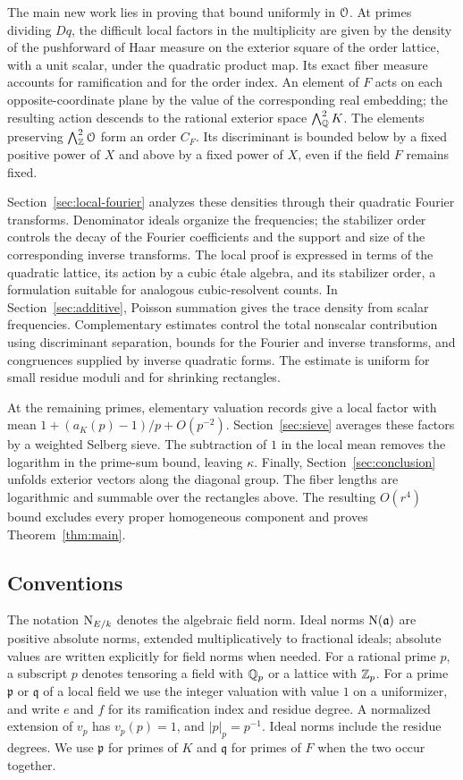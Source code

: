 The main new work lies in proving that bound uniformly in $\mathcal O$.  At primes
dividing $Dq$, the difficult local factors in the multiplicity are given by
the density of the pushforward of Haar measure on the exterior square of the
order lattice, with a unit scalar, under the quadratic product map.
Its exact fiber measure accounts for ramification and for the order index.
An element of $F$ acts on each opposite-coordinate plane by the value of the
corresponding real embedding; the resulting action descends to the rational
exterior space $\bigwedge^2_{\mathbb Q}K$.  The elements preserving
$\bigwedge^2_{\mathbb Z}\mathcal O$ form an order $C_F$.  Its discriminant is bounded
below by a fixed positive power of $X$ and above by a fixed power of $X$,
even if the field $F$ remains fixed.

Section~\ref{sec:local-fourier} analyzes these densities through their
quadratic Fourier transforms.  Denominator ideals organize the frequencies;
the stabilizer order controls the decay of the Fourier coefficients and the
support and size of the corresponding inverse transforms.  The local proof
is expressed in terms of the quadratic lattice, its action by a cubic
\'etale algebra, and its stabilizer order, a formulation suitable for
analogous cubic-resolvent counts.  In Section~\ref{sec:additive}, Poisson
summation gives the trace density from scalar frequencies.  Complementary
estimates control the total nonscalar contribution using discriminant
separation, bounds for the Fourier and inverse transforms, and congruences
supplied by inverse quadratic forms.  The estimate is uniform for small
residue moduli and for shrinking rectangles.

At the remaining primes, elementary valuation records give a local factor
with mean $1+(a_K(p)-1)/p+O(p^{-2})$.  Section~\ref{sec:sieve} averages
these factors by a weighted Selberg sieve.  The subtraction of $1$ in the
local mean removes the logarithm in the prime-sum bound, leaving $\kappa$.
Finally, Section~\ref{sec:conclusion} unfolds exterior vectors along the
diagonal group.  The fiber lengths are logarithmic and summable over the
rectangles above.  The resulting $O(r^4)$ bound excludes every proper
homogeneous component and proves Theorem~\ref{thm:main}.

\subsection{Conventions}

The notation $\operatorname{N}_{E/k}$ denotes the algebraic field norm.  Ideal norms
$\operatorname{N}(\mathfrak a)$ are positive absolute norms, extended multiplicatively
to fractional ideals; absolute values are written explicitly for field
norms when needed.  For a rational prime $p$,
a subscript $p$ denotes tensoring a field with $\mathbb Q_p$ or a lattice with
$\mathbb Z_p$.  For a prime $\mathfrak p$ or $\mathfrak q$ of a local field we use
the integer valuation with value $1$ on a uniformizer, and write $e$ and $f$
for its ramification index and residue degree.  A normalized extension of
$v_p$ has $v_p(p)=1$, and $|p|_p=p^{-1}$.  Ideal norms include the residue
degrees.  We use $\mathfrak p$ for primes of $K$ and $\mathfrak q$ for primes
of $F$ when the two occur together.

